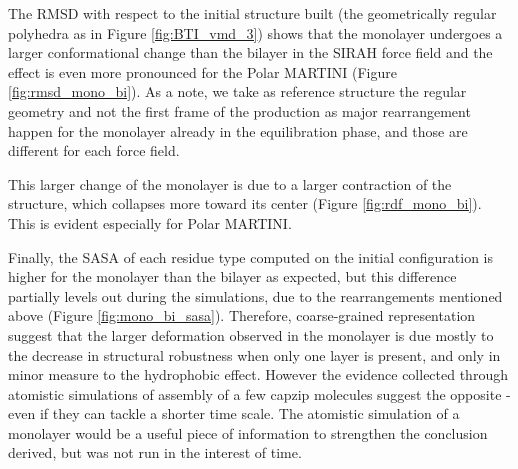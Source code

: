 The RMSD with respect to the initial structure built (the geometrically regular polyhedra as in Figure \ref{fig:BTI_vmd_3}) shows that the monolayer undergoes a larger conformational change than the bilayer in the SIRAH force field and the effect is even more pronounced for the Polar MARTINI (Figure \ref{fig:rmsd_mono_bi}). 
%
As a note, we take as reference structure the regular geometry and not the first frame of the production as major rearrangement happen for the monolayer already in the equilibration phase, and those are different for each force field.

This larger change of the monolayer is due to a larger contraction of the structure, which collapses more toward its center (Figure \ref{fig:rdf_mono_bi}).
%
This is evident especially for Polar MARTINI.
%

Finally, the SASA of each residue type computed on the initial configuration is higher for the monolayer than the bilayer as expected, but this difference partially levels out during the simulations, due to the rearrangements mentioned above (Figure \ref{fig:mono_bi_sasa}). Therefore, coarse-grained representation suggest that the larger deformation observed in the monolayer is due mostly to the decrease in structural robustness when only one layer is present, and only in minor measure to the hydrophobic effect.
%
However the evidence collected through atomistic simulations of assembly of a few capzip molecules suggest the opposite - even if they can tackle a shorter time scale.
The atomistic simulation of a monolayer would be a useful piece of information to strengthen the conclusion derived, but was not run in the interest of time.

